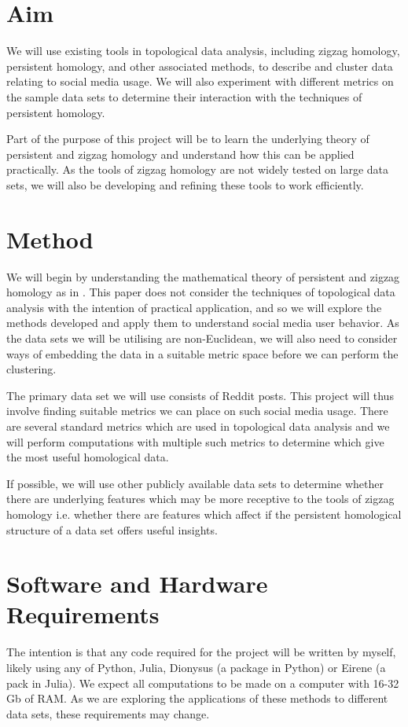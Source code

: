 \documentclass[12pt, a4paper]{article}
\begin{document}
\section*{Aim}

We will use existing tools in topological data analysis, including zigzag homology, persistent homology, and other associated methods, to describe and cluster data relating to social media usage. We will also experiment with different metrics on the sample data sets to determine their interaction with the techniques of persistent homology.

Part of the purpose of this project will be to learn the underlying theory of persistent and zigzag homology and understand how this can be applied practically. As the tools of zigzag homology are not widely tested on large data sets, we will also be developing and refining these tools to work efficiently.

 
\section*{Method}
We will begin by understanding the mathematical theory of persistent and zigzag homology as in \cite{tausz}. This paper does not consider the techniques of topological data analysis with the intention of practical application, and so we will explore the methods developed and apply them to understand social media user behavior. As the data sets we will be utilising are non-Euclidean, we will also need to consider ways of embedding the data in a suitable metric space before we can perform the clustering. 

The primary data set we will use consists of Reddit posts. This project will thus involve finding suitable metrics we can place on such social media usage. There are several standard metrics which are used in topological data analysis and we will perform computations with multiple such metrics to determine which give the most useful homological data. 

If possible, we will use other publicly available data sets to determine whether there are underlying features which may be more receptive to the tools of zigzag homology i.e. whether there are features which affect if the persistent homological structure of a data set offers useful insights. 

\section*{Software and Hardware Requirements}
The intention is that any code required for the project will be written by myself, likely using any of Python, Julia, Dionysus (a package in Python) or Eirene (a pack in Julia). We expect all computations to be made on a computer with 16-32 Gb of RAM. As we are exploring the applications of these methods to different data sets, these requirements may change. 
\end{document}
